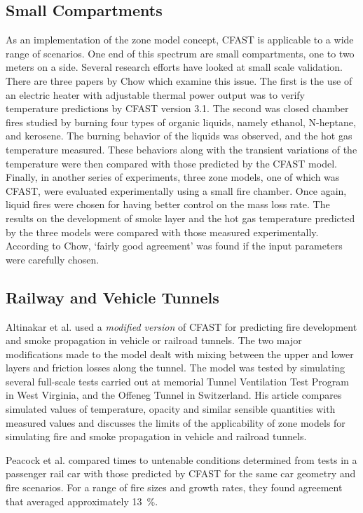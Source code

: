 \subsection{Small Compartments}

As an implementation of the zone model concept, CFAST is applicable to a wide range of scenarios. One end of this spectrum are small compartments, one to two meters on a side. Several research efforts have looked at small scale validation. There are three papers by Chow \cite{Lui:2003,Chow:1995,Chow:1992} which examine this issue. The first is the use of an electric heater with adjustable thermal power output was to verify temperature predictions by CFAST version 3.1. The second was closed chamber fires studied by burning four types of organic liquids, namely ethanol, N-heptane, and kerosene. The burning behavior of the liquids was observed, and the hot gas temperature measured. These behaviors along with the transient variations of the temperature were then compared with those predicted by the CFAST model. Finally, in another series of experiments, three zone models, one of which was CFAST, were evaluated experimentally using a small fire chamber. Once again, liquid fires were chosen for having better control on the mass loss rate. The results on the development of smoke layer and the hot gas temperature predicted by the three models were compared with those measured experimentally. According to Chow, `fairly good agreement' was found if the input parameters were carefully chosen.

\subsection{Railway and Vehicle Tunnels}

Altinakar et al. \cite{Altinakar:1997} used a \emph{modified version} of CFAST for predicting fire development and smoke propagation in vehicle or railroad tunnels. The two major modifications made to the model dealt with mixing between the upper and lower layers and friction losses along the tunnel. The model was tested by simulating several full-scale tests carried out at memorial Tunnel Ventilation Test Program in West Virginia, and the Offeneg Tunnel in Switzerland. His article compares simulated values of temperature, opacity and similar sensible quantities with measured values and discusses the limits of the applicability of zone models for simulating fire and smoke propagation in vehicle and railroad tunnels.

Peacock et al. \cite{Peacock:2004} compared times to untenable conditions determined from tests in a passenger rail car with those predicted by CFAST for the same car geometry and fire scenarios. For a range of fire sizes and growth rates, they found agreement that averaged approximately 13~\%.

